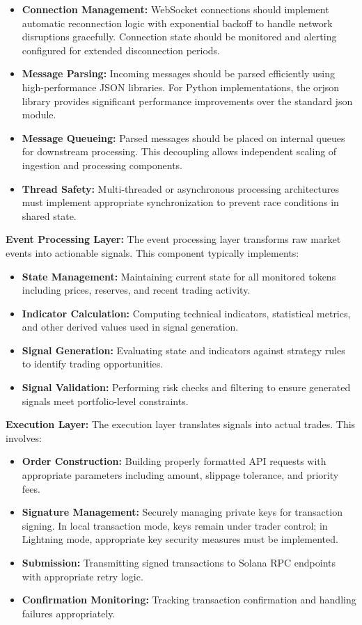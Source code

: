 \documentclass[12pt,a4paper]{article}
\begin{document}
\begin{itemize}
\item \textbf{Connection Management:} WebSocket connections should implement automatic reconnection logic with exponential backoff to handle network disruptions gracefully. Connection state should be monitored and alerting configured for extended disconnection periods.
\item \textbf{Message Parsing:} Incoming messages should be parsed efficiently using high-performance JSON libraries. For Python implementations, the orjson library provides significant performance improvements over the standard json module.
\item \textbf{Message Queueing:} Parsed messages should be placed on internal queues for downstream processing. This decoupling allows independent scaling of ingestion and processing components.
\item \textbf{Thread Safety:} Multi-threaded or asynchronous processing architectures must implement appropriate synchronization to prevent race conditions in shared state.
\end{itemize}

\textbf{Event Processing Layer:} The event processing layer transforms raw market events into actionable signals. This component typically implements:

\begin{itemize}
\item \textbf{State Management:} Maintaining current state for all monitored tokens including prices, reserves, and recent trading activity.
\item \textbf{Indicator Calculation:} Computing technical indicators, statistical metrics, and other derived values used in signal generation.
\item \textbf{Signal Generation:} Evaluating state and indicators against strategy rules to identify trading opportunities.
\item \textbf{Signal Validation:} Performing risk checks and filtering to ensure generated signals meet portfolio-level constraints.
\end{itemize}

\textbf{Execution Layer:} The execution layer translates signals into actual trades. This involves:

\begin{itemize}
\item \textbf{Order Construction:} Building properly formatted API requests with appropriate parameters including amount, slippage tolerance, and priority fees.
\item \textbf{Signature Management:} Securely managing private keys for transaction signing. In local transaction mode, keys remain under trader control; in Lightning mode, appropriate key security measures must be implemented.
\item \textbf{Submission:} Transmitting signed transactions to Solana RPC endpoints with appropriate retry logic.
\item \textbf{Confirmation Monitoring:} Tracking transaction confirmation and handling failures appropriately.
\end{itemize}
\end{document}
